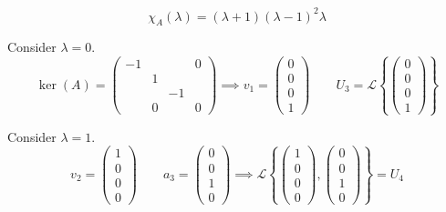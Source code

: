 \documentclass[a4paper]{article}
\theoremstyle{definition}
\newcommand\set[1]{\left\{#1\right\}}
\begin{document}
\[ \chi_A(\lambda) = (\lambda + 1) (\lambda - 1)^2 \lambda \]

Consider $\lambda = 0$.
\[ \ker(A) = \begin{pmatrix} -1 & & & 0 \\ & 1 & & \\ & & -1 & \\ & 0 & & 0 \end{pmatrix} \implies v_1 = \begin{pmatrix} 0 \\ 0 \\ 0 \\ 1 \end{pmatrix} \qquad U_3 = \mathcal L\set{\begin{pmatrix} 0 \\ 0 \\ 0 \\ 1 \end{pmatrix}} \]

Consider $\lambda = 1$.
\[ v_2 = \begin{pmatrix} 1 \\ 0 \\ 0 \\ 0 \end{pmatrix} \qquad a_3 = \begin{pmatrix} 0 \\ 0 \\ 1 \\ 0 \end{pmatrix} \implies \mathcal L\set{\begin{pmatrix} 1 \\ 0 \\ 0 \\ 0 \end{pmatrix}, \begin{pmatrix} 0 \\ 0 \\ 1 \\ 0 \end{pmatrix}} = U_4 \]
\end{document}
